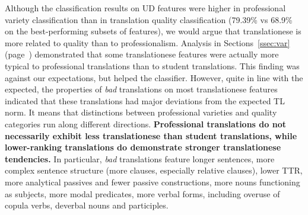 Although the classification results on UD features were higher in professional variety classification than in translation quality classification (79.39\% vs 68.9\% on the best-performing subsets of features), we would argue that translationese is more related to quality than to professionalism. Analysis in Sections~\ref{ssec:var} (page~\pageref{pg:more_professional_more_translated}) demonstrated that some translationese features were actually more typical to professional translations than to student translations. This finding was against our expectations, but helped the classifier. 
However, quite in line with the expected, the properties of \textit{bad} translations on most translationese features indicated that these translations had major deviations from the expected TL norm. %
\label{pg:bad_tendencies}
It means that distinctions between professional varieties and quality categories run along different directions. \textbf{Professional translations do not necessarily exhibit less translationese than student translations, while lower-ranking translations do demonstrate stronger translationese tendencies.} In particular, \textit{bad} translations feature longer sentences, more complex sentence structure (more clauses, especially relative clauses), lower TTR, more analytical passives and fewer passive constructions, more nouns functioning as subjects, more modal predicates, more verbal forms, including overuse of copula verbs, deverbal nouns and participles. 


